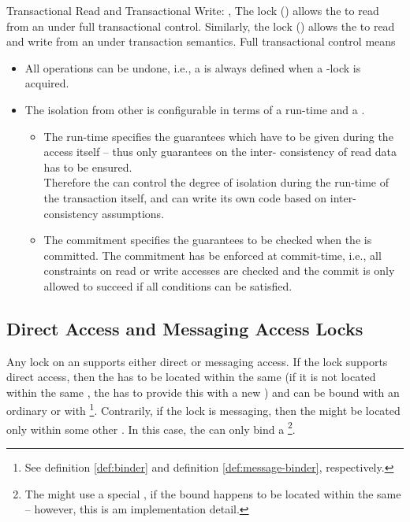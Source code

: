 \documentclass[a4paper, 12pt]{book}
\begin{document}
\begin{definition*}{Transactional Read and Transactional Write: \TRANSREAD, \TRANSWRITE}
  The lock  (\TRANSREAD) allows the  to
  read from an  under full transactional control. Similarly, the
  lock  (\TRANSWRITE) allows the  to
  read and write from an  under transaction semantics. Full
  transactional control means
  \begin{itemize}
  \item All operations can be undone, i.e., a  is always
    defined when a \TRANSWRITE-lock is acquired.
  \item The isolation from other  is
    configurable in terms of a run-time  and a
    . 
    \begin{itemize}
    \item The run-time  specifies the guarantees which
      have to be given during the access itself -- thus only guarantees on the
      inter- consistency of read data has to be ensured.\\
      Therefore the  can control the degree of isolation during the
      run-time of the transaction itself, and can write its own code based on
      inter- consistency assumptions. 
    \item The commitment  specifies the guarantees to be
      checked when the  is committed. The commitment
       has be enforced at commit-time, i.e., all
      constraints on  read or write accesses are checked and the commit is
      only allowed to succeed if all conditions can be satisfied.  
    \end{itemize}
  \end{itemize}
\end{definition*}


\subsection{Direct Access and Messaging Access Locks}
\label{sec:esa:def:direct-and-remote-locks}

Any lock on an  supports either direct or messaging
access. If the lock supports direct access, then the  has
to be located within the same  (if it is not located
within the same , the \SYNEIGHT has to provide this
 with a new ) and can be bound with an
ordinary  or with \footnote{See
definition \vref{def:binder} and definition \vref{def:message-binder},
respectively.}.
%
Contrarily, if the lock is messaging, then the  might be
located only within some other . In this case, the
 can only bind a  \footnote{The
\SYNEIGHT might use a special , if the bound
 happens to be located within the same  --
however, this is am implementation detail.}.
\end{document}
